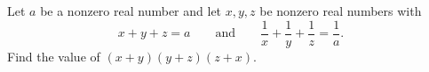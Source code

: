 Let $a$ be a nonzero real number and let $x,y,z$ be nonzero real numbers with
\[x+y+z=a\qquad\text{and}\qquad\dfrac{1}{x}+\dfrac{1}{y}+\dfrac{1}{z}=\dfrac{1}{a} .\]
Find the value of $(x+y)(y+z)(z+x)$.

